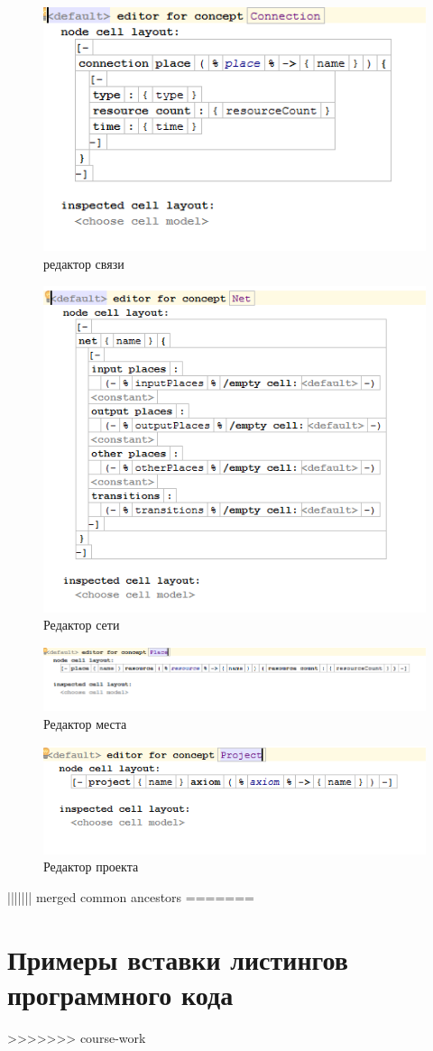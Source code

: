 \begin{figure}[ht]
	\centering
	\includegraphics[width=0.7\linewidth]{images/editor/Connection}
	\caption{редактор связи}
	\label{fig:connection}
\end{figure}

\begin{figure}[ht]
	\centering
	\includegraphics[width=0.7\linewidth]{images/editor/Net}
	\caption{Редактор сети}
	\label{fig:net}
\end{figure}

\begin{figure}[ht]
	\centering
	\includegraphics[width=0.7\linewidth]{images/editor/Place}
	\caption{Редактор места}
	\label{fig:place}
\end{figure}

\begin{figure}[ht]
	\centering
	\includegraphics[width=0.7\linewidth]{images/editor/Project}
	\caption{Редактор проекта}
	\label{fig:project}
\end{figure}
||||||| merged common ancestors
=======
\chapter{Примеры вставки листингов программного кода} \label{AppendixA}
>>>>>>> course-work
